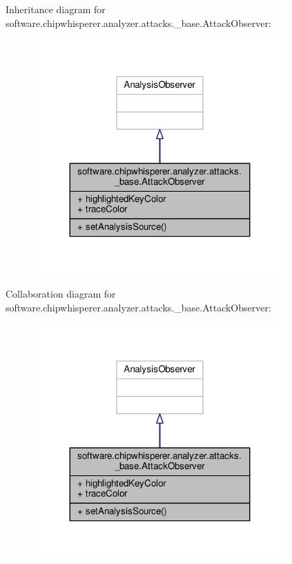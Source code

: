 Inheritance diagram for software.\+chipwhisperer.\+analyzer.\+attacks.\+\_\+base.\+Attack\+Observer\+:\nopagebreak
\begin{figure}[H]
\begin{center}
\leavevmode
\includegraphics[width=275pt]{dd/d70/classsoftware_1_1chipwhisperer_1_1analyzer_1_1attacks_1_1__base_1_1AttackObserver__inherit__graph}
\end{center}
\end{figure}


Collaboration diagram for software.\+chipwhisperer.\+analyzer.\+attacks.\+\_\+base.\+Attack\+Observer\+:\nopagebreak
\begin{figure}[H]
\begin{center}
\leavevmode
\includegraphics[width=275pt]{d2/d88/classsoftware_1_1chipwhisperer_1_1analyzer_1_1attacks_1_1__base_1_1AttackObserver__coll__graph}
\end{center}
\end{figure}


